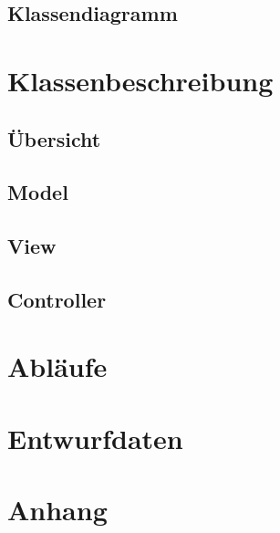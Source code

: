 \documentclass{article}
\begin{document}
\subsection{Klassendiagramm}

\section{Klassenbeschreibung}
\subsection{Übersicht}
\subsection{Model}
\subsection{View}
\subsection{Controller}

\section{Abläufe}

\section{Entwurfdaten}

\section{Anhang}
\glsaddall
\printglossary[numberedsection, style=altlist]
\end{document}
